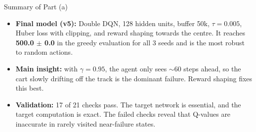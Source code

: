 \FloatBarrier
\begin{summarybox}{Summary of Part (a)}
\begin{itemize}
  \item \textbf{Final model (v5):} Double DQN, 128 hidden units, buffer 50k, $\tau = 0.005$, Huber loss with clipping, and reward shaping towards the centre. It reaches \textbf{500.0 $\pm$ 0.0} in the greedy evaluation for all 3 seeds and is the most robust to random actions.
  \item \textbf{Main insight:} with $\gamma = 0.95$, the agent only sees $\sim$60 steps ahead, so the cart slowly drifting off the track is the dominant failure. Reward shaping fixes this best.
  \item \textbf{Validation:} 17 of 21 checks pass. The target network is essential, and the target computation is exact. The failed checks reveal that Q-values are inaccurate in rarely visited near-failure states.
\end{itemize}
\end{summarybox}
